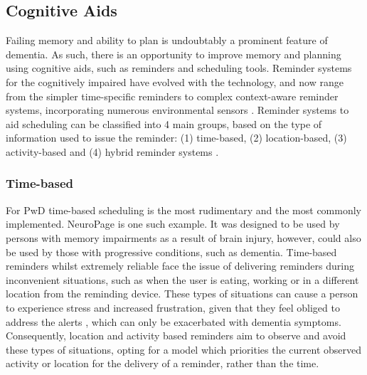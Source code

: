 \subsection{Cognitive Aids}
Failing memory and ability to plan is undoubtably a prominent feature of dementia. As such, there is an opportunity to improve memory and planning using cognitive aids, such as reminders and scheduling tools. Reminder systems for the cognitively impaired have evolved with the technology, and now range from the simpler time-specific reminders to complex context-aware reminder systems, incorporating numerous environmental sensors \cite{Hersh1994, Zhang2008, Zhou2012}. Reminder systems to aid scheduling can be classified into 4 main groups, based on the type of information used to issue the reminder: (1) time-based, (2) location-based, (3) activity-based and (4) hybrid reminder systems \cite{Seelye2012, Hartin2014-IWAAL}.

\subsubsection{Time-based}
For PwD time-based scheduling is the most rudimentary and the most commonly implemented. NeuroPage \cite{Hersh1994, Wilson1997} is one such example. It was designed to be used by persons with memory impairments as a result of brain injury, however, could also be used by those with progressive conditions, such as dementia. Time-based reminders whilst extremely reliable face the issue of delivering reminders during inconvenient situations, such as when the user is eating, working or in a different location from the reminding device. These types of situations can cause a person to experience stress and increased frustration, given that they feel obliged to address the alerts \cite{Mark2008}, which can only be exacerbated with dementia symptoms.
Consequently, location and activity based reminders aim to observe and avoid these types of situations, opting for a model which priorities the current observed activity or location for the delivery of a reminder, rather than the time.

